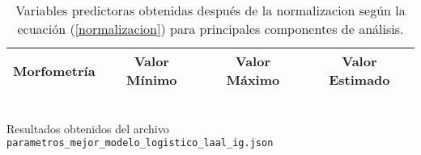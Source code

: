 \documentclass{article}
\begin{document}
\begin{flushleft}
\begin{table}[h]
    \centering
    \caption{Variables predictoras obtenidas después de la normalizacion según la ecuación (\ref{normalizacion}) para principales componentes de análisis.}
    \bigskip
    \renewcommand{\arraystretch}{1.3}
    \begin{tabular}{|c|c|c|c|}
    \hline
    \textbf{Morfometría} & \textbf{Valor Mínimo} & \textbf{Valor Máximo} & \textbf{Valor Estimado}\\
    \hline
    
    \end{tabular}
    \label{mejorModeloLogistico}
    \\[10pt]
    Resultados obtenidos del archivo \texttt{parametros\_mejor\_modelo\_logistico\_laal\_ig.json}
\end{table}

\end{flushleft}
\end{document}
